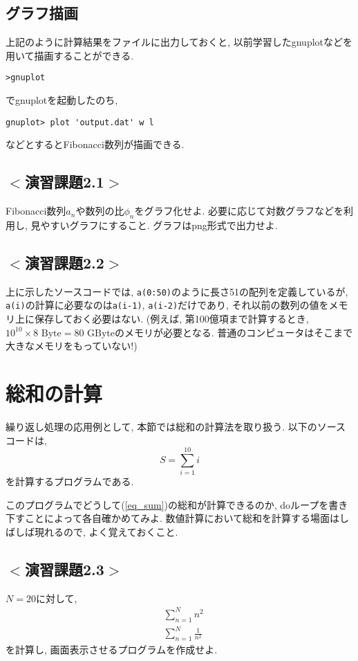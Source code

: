 \subsection*{グラフ描画}
上記のように計算結果をファイルに出力しておくと, 以前学習したgnuplotなどを用いて描画することができる. 
\begin{Verbatim}[frame=single]
>gnuplot
\end{Verbatim}
でgnuplotを起動したのち, 
\begin{Verbatim}[frame=single]
gnuplot> plot 'output.dat' w l
\end{Verbatim}
などとするとFibonacci数列が描画できる. 

\subsection*{$<$演習課題2.1$>$}
Fibonacci数列$a_n$や数列の比$\phi_n$をグラフ化せよ. 
必要に応じて対数グラフなどを利用し, 見やすいグラフにすること. 
グラフはpng形式で出力せよ.  

\subsection*{$<$演習課題2.2$>$}
上に示したソースコードでは, \verb|a(0:50)|のように長さ51の配列を定義しているが, 
\verb|a(i)|の計算に必要なのは\verb|a(i-1)|, \verb|a(i-2)|だけであり, 
それ以前の数列の値をメモリ上に保存しておく必要はない. 
(例えば, 第100億項まで計算するとき, $10^{10} \times 8\mbox{ Byte}=80\mbox{ GByte}$のメモリが必要となる. 
普通のコンピュータはそこまで大きなメモリをもっていない!)

\section{総和の計算}
繰り返し処理の応用例として, 本節では総和の計算法を取り扱う. 
以下のソースコードは, 
\begin{equation}
S=\sum_{i=1}^{10} i
\label{eq_sum}
\end{equation}
を計算するプログラムである. 


このプログラムでどうして(\ref{eq_sum})の総和が計算できるのか, 
doループを書き下すことによって各自確かめてみよ. 
数値計算において総和を計算する場面はしばしば現れるので, 
よく覚えておくこと. 


\subsection*{$<$演習課題2.3$>$}
$N=20$に対して, 
\begin{align}
&\sum_{n=1}^{N} n^2 \\
&\sum_{n=1}^{N} \frac{1}{n^2}
\end{align}
を計算し, 画面表示させるプログラムを作成せよ. 

